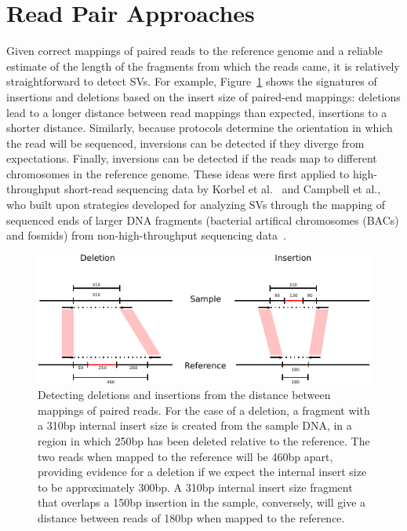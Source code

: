 \section{Read Pair Approaches}\label{section_read_pair}

Given correct mappings of paired reads to the reference genome and a reliable estimate of the length of the fragments from which the reads came, it is relatively straightforward to detect SVs. For example, Figure~\ref{rp_signatures} shows the signatures of insertions and deletions based on the insert size of paired-end mappings: deletions lead to a longer distance between read mappings than expected, insertions to a shorter distance. Similarly, because protocols determine the orientation in which the read will be sequenced, inversions can be detected if they diverge from expectations. Finally, inversions can be detected if the reads map to different chromosomes in the reference genome. These ideas were first applied to high-throughput short-read sequencing data by Korbel et al.~\cite{Korbel:2007p544} and Campbell et al.\cite{Campbell:2008p539}, who built upon strategies developed for analyzing SVs through the mapping of sequenced ends of larger DNA fragments (bacterial artifical chromosomes (BACs) and fosmids) from non-high-throughput sequencing data~\cite{Volik:2003fh,Raphael:2003ug,Tuzun:2005bp}.

\begin{figure}
\centering
\includegraphics[width=\textwidth]{figures/rp_signatures.pdf}
\caption{Detecting deletions and insertions from the distance between mappings of paired reads. For the case of a deletion, a fragment with a 310bp internal insert size is created from the sample DNA, in a region in which 250bp has been deleted relative to the reference. The two reads when mapped to the reference will be 460bp apart, providing evidence for a deletion if we expect the internal insert size to be approximately 300bp. A 310bp internal insert size fragment that overlaps a 150bp insertion in the sample, conversely, will give a distance between reads of 180bp when mapped to the reference.}
\label{rp_signatures}
\end{figure}

